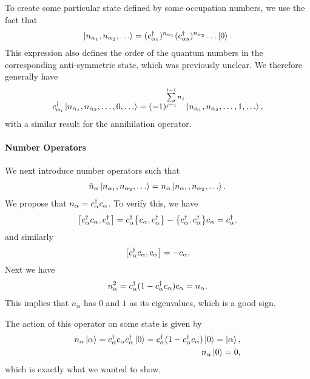 To create some particular state defined by some occupation numbers, we use the fact that
\begin{align*}
	\ket{n_{\alpha_{1}}, n_{\alpha_{2}}, \dots} = (c_{\alpha_{1}}^{\dagger})^{n_{\alpha_{1}}}(c_{\alpha_{2}}^{\dagger})^{n_{\alpha_{2}}}\dots\ket{0}.
\end{align*}
This expression also defines the order of the quantum numbers in the corresponding anti-symmetric state, which was previously unclear. We therefore generally have
\begin{align*}
	c_{\alpha_{i}}^{\dagger}\ket{n_{\alpha_{1}}, n_{\alpha_{2}}, \dots, 0, \dots} = (-1)^{\sum\limits_{j = 1}^{i - 1}n_{j}}\ket{n_{\alpha_{1}}, n_{\alpha_{2}}, \dots, 1, \dots},
\end{align*}
with a similar result for the annihilation operator.

\paragraph{Number Operators}
We next introduce number operators such that
\begin{align*}
	\hat{n}_{\alpha}\ket{n_{\alpha_{1}}, n_{\alpha_{2}}, \dots} = n_{\alpha}\ket{n_{\alpha_{1}}, n_{\alpha_{2}}, \dots}.
\end{align*}
We propose that $n_{\alpha} = c_{\alpha}^{\dagger}c_{\alpha}$. To verify this, we have
\begin{align*}
	\comm{\adj{c_{\alpha}}c_{\alpha}}{\adj{c_{\alpha}}} = \adj{c_{\alpha}}\acomm{c_{\alpha}}{\adj{c_{\alpha}}} - \acomm{\adj{c_{\alpha}}}{\adj{c_{\alpha}}}c_{\alpha} = \adj{c_{\alpha}},
\end{align*}
and similarly
\begin{align*}
	\comm{\adj{c_{\alpha}}c_{\alpha}}{c_{\alpha}} = -c_{\alpha}.
\end{align*}
Next we have
\begin{align*}
	n_{\alpha}^{2} = c_{\alpha}^{\dagger}(1 - c_{\alpha}^{\dagger}c_{\alpha})c_{\alpha} = n_{\alpha}.
\end{align*}
This implies that $n_{\alpha}$ has $0$ and $1$ as its eigenvalues, which is a good sign.

The action of this operator on some state is given by
\begin{align*}
	n_{\alpha}\ket{\alpha} = c_{\alpha}^{\dagger}c_{\alpha}c_{\alpha}^{\dagger}\ket{0} = c_{\alpha}^{\dagger}(1 - c_{\alpha}^{\dagger}c_{\alpha})\ket{0} = \ket{\alpha}, \\
	n_{\alpha}\ket{0} = 0,
\end{align*}
which is exactly what we wanted to show.

